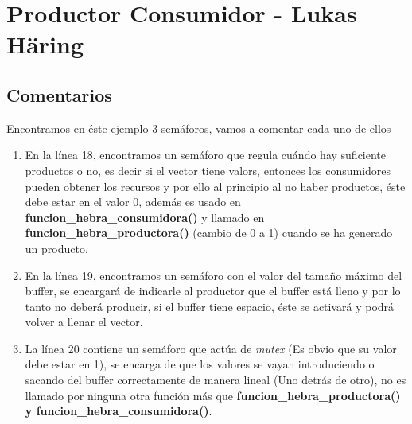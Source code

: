 \documentclass[8pt, a4paper, titlepage]{article}
\begin{document}
   \section{Productor Consumidor - Lukas Häring}
   		\subsection{Comentarios}
   		Encontramos en éste ejemplo 3 semáforos, vamos a comentar cada uno de ellos
   		\begin{enumerate}
   			\item En la línea 18, encontramos un semáforo que regula cuándo hay suficiente productos o no, es decir si el vector tiene valors, entonces los consumidores pueden obtener los recursos y por ello al principio al no haber productos, éste debe estar en el valor 0, además es usado en \textbf{funcion\_hebra\_consumidora()} y llamado en \textbf{funcion\_hebra\_productora()} (cambio de 0 a 1) cuando se ha generado un producto.
   			\item En la línea 19, encontramos un semáforo con el valor del tamaño máximo del buffer, se encargará de indicarle al productor que el buffer está lleno y por lo tanto no deberá producir, si el buffer tiene espacio, éste se activará y podrá volver a llenar el vector.
   			\item La línea 20 contiene un semáforo que actúa de \textit{mutex} (Es obvio que su valor debe estar en 1), se encarga de que los valores se vayan introduciendo o sacando del buffer correctamente de manera lineal (Uno detrás de otro), no es llamado por ninguna otra función más que \textbf{funcion\_hebra\_productora() y funcion\_hebra\_consumidora()}.
   		\end{enumerate}
\end{document}
